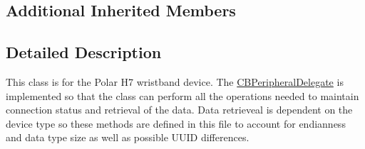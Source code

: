 \subsection*{Additional Inherited Members}


\subsection{Detailed Description}
This class is for the Polar H7 wristband device. The \hyperlink{class_c_b_peripheral_delegate-p}{C\-B\-Peripheral\-Delegate} is implemented so that the class can perform all the operations needed to maintain connection status and retrieval of the data. Data retrieveal is dependent on the device type so these methods are defined in this file to account for endianness and data type size as well as possible U\-U\-I\-D differences. 

